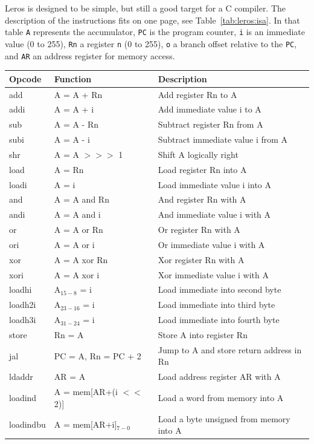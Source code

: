 \documentclass[%
    10pt,
    headinclude, footexclude,
    openright, %
    notitlepage,
    cleardoubleempty,
    headsepline,
    pointlessnumbers,
    bibtotoc, idxtotoc,
    ]{scrbook}
\newcommand{\code}[1]{{\small{\texttt{#1}}}}
\begin{document}
Leros is designed to be simple, but still a good target for a C compiler.
The description of the instructions fits on one page, see Table~\ref{tab:leros:isa}.
In that table \code{A} represents the accumulator, \code{PC} is the program counter,
\code{i} is an immediate value (0 to 255), \code{Rn} a register
\code{n} (0 to 255), \code{o} a branch offset relative to the \code{PC},
and \code{AR} an address register for memory access.

\begin{table}
\centering
\begin{tabular}{lll}
\toprule
Opcode & Function & Description\\
\midrule
add & A = A + Rn & Add register Rn to A \\
addi & A = A + i & Add immediate value i to A \\
sub & A = A - Rn & Subtract register Rn from A \\
subi & A = A - i & Subtract immediate value i from A \\
shr & A = A $>>>$ 1 & Shift A logically right \\
load & A = Rn & Load register Rn into A \\
loadi & A = i & Load immediate value i into A \\
and & A = A and Rn & And register Rn with A \\
andi & A = A and i & And immediate value i with A \\
or & A = A or Rn & Or register Rn with A \\
ori & A = A or i & Or immediate value i with A \\
xor & A = A xor Rn & Xor register Rn with A \\
xori & A = A xor i & Xor immediate value i with A \\
loadhi & A$_{15-8}$ = i & Load immediate into second byte \\
loadh2i & A$_{23-16}$ = i  & Load immediate into third byte \\
loadh3i & A$_{31-24}$ = i & Load immediate into fourth byte \\
store & Rn = A & Store A into register Rn \\
jal & PC = A, Rn = PC + 2 & Jump to A and store return address in Rn \\
ldaddr & AR = A & Load address register AR with A \\
loadind & A = mem[AR+(i $<<$ 2)] & Load a word from memory into A \\
loadindbu & A = mem[AR+i]$_{7-0}$  &  Load a byte unsigned from memory into A\\

\end{tabular}
\end{table}
\end{document}
